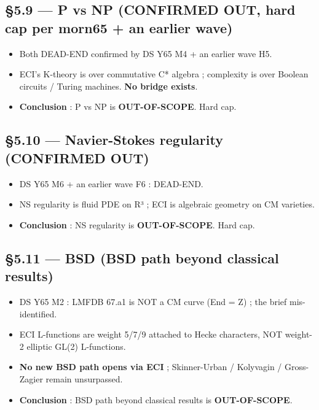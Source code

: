 \documentclass[
  11pt,
  a4paper,
]{article}
\providecommand{\tightlist}{\setlength{\itemsep}{0pt}\setlength{\parskip}{0pt}}
\providecommand{\tightlist}{%
  \setlength{\itemsep}{0pt}\setlength{\parskip}{0pt}}
\begin{document}
\hypertarget{p-vs-np-confirmed-out-hard-cap-per-morn65-an earlier wave}{%
\subsection{§5.9 --- P vs NP (CONFIRMED OUT, hard cap per morn65 + an earlier wave)}\label{p-vs-np-confirmed-out-hard-cap-per-morn65-an earlier wave}}

\begin{itemize}
\tightlist
\item
  Both DEAD-END confirmed by DS Y65 M4 + an earlier wave H5.
\item
  ECI's K-theory is over commutative C* algebra ; complexity is over Boolean circuits / Turing machines. \textbf{No bridge exists}.
\item
  \textbf{Conclusion} : P vs NP is \textbf{OUT-OF-SCOPE}. Hard cap.
\end{itemize}

\hypertarget{navier-stokes-regularity-confirmed-out}{%
\subsection{§5.10 --- Navier-Stokes regularity (CONFIRMED OUT)}\label{navier-stokes-regularity-confirmed-out}}

\begin{itemize}
\tightlist
\item
  DS Y65 M6 + an earlier wave F6 : DEAD-END.
\item
  NS regularity is fluid PDE on R³ ; ECI is algebraic geometry on CM varieties.
\item
  \textbf{Conclusion} : NS regularity is \textbf{OUT-OF-SCOPE}. Hard cap.
\end{itemize}

\hypertarget{bsd-bsd-path-beyond-classical-results}{%
\subsection{§5.11 --- BSD (BSD path beyond classical results)}\label{bsd-bsd-path-beyond-classical-results}}

\begin{itemize}
\tightlist
\item
  DS Y65 M2 : LMFDB 67.a1 is NOT a CM curve (End = Z) ; the brief mis-identified.
\item
  ECI L-functions are weight 5/7/9 attached to Hecke characters, NOT weight-2 elliptic GL(2) L-functions.
\item
  \textbf{No new BSD path opens via ECI} ; Skinner-Urban / Kolyvagin / Gross-Zagier remain unsurpassed.
\item
  \textbf{Conclusion} : BSD path beyond classical results is \textbf{OUT-OF-SCOPE}.
\end{itemize}
\end{document}
